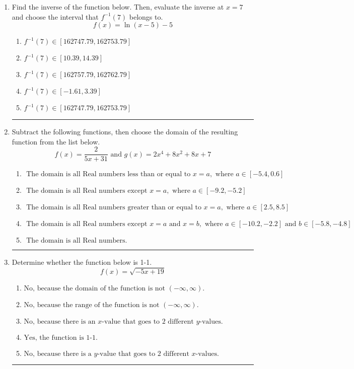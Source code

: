 \documentclass[14pt]{extbook}
\newcommand{\litem}[1]{\item#1\hspace*{-1cm}\rule{\textwidth}{0.4pt}}
\begin{document}
\begin{enumerate}
{\begin{enumerate}[label=\Alph*.]
\end{enumerate} }
\litem{
Find the inverse of the function below. Then, evaluate the inverse at $x = 7$ and choose the interval that $f^{-1}(7)$ belongs to.\[ f(x) = \ln{(x-5)}-5 \]\begin{enumerate}[label=\Alph*.]
\item \( f^{-1}(7) \in [162747.79, 162753.79] \)
\item \( f^{-1}(7) \in [10.39, 14.39] \)
\item \( f^{-1}(7) \in [162757.79, 162762.79] \)
\item \( f^{-1}(7) \in [-1.61, 3.39] \)
\item \( f^{-1}(7) \in [162747.79, 162753.79] \)

\end{enumerate} }
\litem{
Subtract the following functions, then choose the domain of the resulting function from the list below.\[ f(x) = \frac{2}{5x+31} \text{ and } g(x) = 2x^{4} +8 x^{2} +8 x + 7 \]\begin{enumerate}[label=\Alph*.]
\item \( \text{ The domain is all Real numbers less than or equal to } x = a, \text{ where } a \in [-5.4, 0.6] \)
\item \( \text{ The domain is all Real numbers except } x = a, \text{ where } a \in [-9.2, -5.2] \)
\item \( \text{ The domain is all Real numbers greater than or equal to } x = a, \text{ where } a \in [2.5, 8.5] \)
\item \( \text{ The domain is all Real numbers except } x = a \text{ and } x = b, \text{ where } a \in [-10.2, -2.2] \text{ and } b \in [-5.8, -4.8] \)
\item \( \text{ The domain is all Real numbers. } \)

\end{enumerate} }
\litem{
Determine whether the function below is 1-1.\[ f(x) = \sqrt{-5 x + 19} \]\begin{enumerate}[label=\Alph*.]
\item \( \text{No, because the domain of the function is not $(-\infty, \infty)$.} \)
\item \( \text{No, because the range of the function is not $(-\infty, \infty)$.} \)
\item \( \text{No, because there is an $x$-value that goes to 2 different $y$-values.} \)
\item \( \text{Yes, the function is 1-1.} \)
\item \( \text{No, because there is a $y$-value that goes to 2 different $x$-values.} \)

\end{enumerate} }
\end{enumerate}
\end{document}
